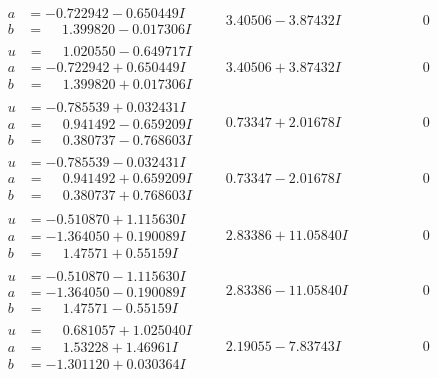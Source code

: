 \documentclass[1p]{elsarticle_modified}
\theoremstyle{definition}
\begin{document}
$$\begin{array}{c|c|c}
\begin{aligned}
a &= -0.722942 - 0.650449 I \\
b &= \phantom{-}1.399820 - 0.017306 I\end{aligned}
 & \phantom{-}3.40506 - 3.87432 I & \phantom{-0.000000 } 0 \\ \hline\begin{aligned}
u &= \phantom{-}1.020550 - 0.649717 I \\
a &= -0.722942 + 0.650449 I \\
b &= \phantom{-}1.399820 + 0.017306 I\end{aligned}
 & \phantom{-}3.40506 + 3.87432 I & \phantom{-0.000000 } 0 \\ \hline\begin{aligned}
u &= -0.785539 + 0.032431 I \\
a &= \phantom{-}0.941492 - 0.659209 I \\
b &= \phantom{-}0.380737 - 0.768603 I\end{aligned}
 & \phantom{-}0.73347 + 2.01678 I & \phantom{-0.000000 } 0 \\ \hline\begin{aligned}
u &= -0.785539 - 0.032431 I \\
a &= \phantom{-}0.941492 + 0.659209 I \\
b &= \phantom{-}0.380737 + 0.768603 I\end{aligned}
 & \phantom{-}0.73347 - 2.01678 I & \phantom{-0.000000 } 0 \\ \hline\begin{aligned}
u &= -0.510870 + 1.115630 I \\
a &= -1.364050 + 0.190089 I \\
b &= \phantom{-}1.47571 + 0.55159 I\end{aligned}
 & \phantom{-}2.83386 + 11.05840 I & \phantom{-0.000000 } 0 \\ \hline\begin{aligned}
u &= -0.510870 - 1.115630 I \\
a &= -1.364050 - 0.190089 I \\
b &= \phantom{-}1.47571 - 0.55159 I\end{aligned}
 & \phantom{-}2.83386 - 11.05840 I & \phantom{-0.000000 } 0 \\ \hline\begin{aligned}
u &= \phantom{-}0.681057 + 1.025040 I \\
a &= \phantom{-}1.53228 + 1.46961 I \\
b &= -1.301120 + 0.030364 I\end{aligned}
 & \phantom{-}2.19055 - 7.83743 I & \phantom{-0.000000 } 0 \\ \hline\begin{aligned}

\end{aligned}
\end{array}$$
\end{document}
